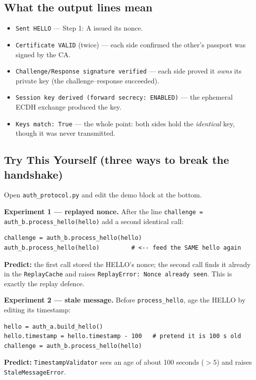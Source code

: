 \documentclass[11pt,a4paper]{report}
\begin{document}
\subsection{What the output lines mean}
\begin{itemize}
  \item \texttt{Sent HELLO} --- Step 1: A issued its nonce.
  \item \texttt{Certificate VALID} (twice) --- each side confirmed the other's
        passport was signed by the CA.
  \item \texttt{Challenge/Response signature verified} --- each side proved it
        \emph{owns} its private key (the challenge--response succeeded).
  \item \texttt{Session key derived (forward secrecy: ENABLED)} --- the ephemeral
        ECDH exchange produced the key.
  \item \texttt{Keys match: True} --- the whole point: both sides hold the
        \emph{identical} key, though it was never transmitted.
\end{itemize}

\subsection{Try This Yourself (three ways to break the handshake)}
Open \texttt{auth\_protocol.py} and edit the demo block at the bottom.

\textbf{Experiment 1 --- replayed nonce.} After the line
\texttt{challenge = auth\_b.process\_hello(hello)} add a second identical call:
\begin{lstlisting}[style=term]
challenge = auth_b.process_hello(hello)
auth_b.process_hello(hello)         # <-- feed the SAME hello again
\end{lstlisting}
\textbf{Predict:} the first call stored the HELLO's nonce; the second call finds
it already in the \texttt{ReplayCache} and raises \texttt{ReplayError: Nonce
already seen}. This is exactly the replay defence.

\textbf{Experiment 2 --- stale message.} Before \texttt{process\_hello}, age the
HELLO by editing its timestamp:
\begin{lstlisting}[style=term]
hello = auth_a.build_hello()
hello.timestamp = hello.timestamp - 100   # pretend it is 100 s old
challenge = auth_b.process_hello(hello)
\end{lstlisting}
\textbf{Predict:} \texttt{TimestampValidator} sees an age of about 100 seconds
($> 5$) and raises \texttt{StaleMessageError}.
\end{document}
